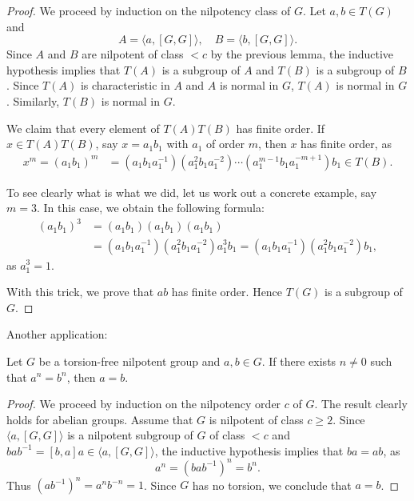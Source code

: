 \begin{proof}
We proceed by induction on the nilpotency class of $G$. 
Let $a,b\in T(G)$ and 
\[
	A=\langle a,[G,G]\rangle,\quad
	B=\langle b,[G,G]\rangle.
\]
Since  $A$ and $B$ are nilpotent of class $<c$ by the previous lemma, 
the inductive hypothesis 
implies that $T(A)$ is a subgroup of $A$ and $T(B)$ is a subgroup of $B$.
Since $T(A)$ is characteristic in $A$ and $A$ is normal in $G$, $T(A)$ is normal in $G$. 
Similarly, $T(B)$ is normal in $G$. 

We claim that every element of 
$T(A)T(B)$ has finite order. If 
$x\in T(A)T(B)$, say $x=a_1b_1$ with
$a_1$ of order $m$, then $x$ has finite order, as 
\begin{align*}
x^m=(a_1b_1)^m&=%
(a_1b_1a_1^{-1})(a_1^2b_1a_1^{-2})\cdots (a_1^{m-1} b_1 a_1^{-m+1})b_1\in T(B).
\end{align*}

To see clearly what is what we did, let us work out a concrete 
example, say $m=3$. In this case, we obtain the following formula:
\begin{align*}
(a_1b_1)^3&=(a_1b_1)(a_1b_1)(a_1b_1)\\
&=(a_1b_1a_1^{-1})(a_1^2b_1a_1^{-2})a_1^3b_1
=(a_1b_1a_1^{-1})(a_1^2b_1a_1^{-2})b_1,
\end{align*}
as $a_1^3=1$.

With this trick, we prove that $ab$ has finite order. Hence $T(G)$ 
is a subgroup of $G$. 
\end{proof}

Another application:

\begin{theorem}
\label{thm:a=b}
Let $G$ be a torsion-free nilpotent group and $a,b\in G$. If there exists 
$n\ne 0$ such that $a^n=b^n$, then $a=b$.
\end{theorem}

\begin{proof}
We proceed by induction on the nilpotency order $c$ of $G$. 
The result clearly holds for abelian groups. Assume that $G$ is nilpotent of class $c\geq2$. 
Since $\langle a,[G,G]\rangle$ is a nilpotent subgroup of $G$ of class $<c$
and $bab^{-1}=[b,a]a\in \langle
a,[G,G]\rangle$, the inductive hypothesis implies that 
$ba=ab$, as 
\[
	a^n=(bab^{-1})^n=b^n.
\]
Thus $(ab^{-1})^n=a^nb^{-n}=1$. Since $G$ has no torsion, we conclude that 
$a=b$.
\end{proof}

